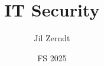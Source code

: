 \documentclass[a4paper, fontsize = 8pt, landscape]{scrartcl}
\title{IT Security}
\author{Jil Zerndt}
\date{FS 2025}
\begin{document}
\begin{multicols}{3}
	\thispagestyle{TitlePageStyle}
	\maketitle
	\sffamily
	
	\raggedcolumns
	\pagebreak
	
	\raggedcolumns
	\pagebreak
\end{multicols}
\end{document}

